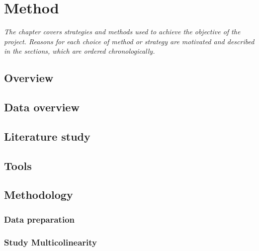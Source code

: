 \chapter{Method}
\emph{The chapter covers strategies and methods used to achieve the objective of the project. Reasons for each choice of method or strategy are motivated and described in the sections, which are ordered chronologically.}





\section{Overview}
\section{Data overview}
\section{Literature study}
\section{Tools}
\section{Methodology}
	\subsection{Data preparation}
	\subsection{Study Multicolinearity}
